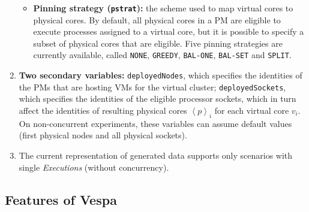 \documentclass[11pt]{article}
\newcommand{\tuple}[1]{\ensuremath{\left \langle #1 \right \rangle }}
\begin{document}
\begin{enumerate}
\begin{itemize}
  \item \textbf{Pinning strategy (\texttt{pstrat}):} the scheme used to map virtual cores to physical cores. By default, all physical cores in a PM are eligible to execute processes assigned to a virtual core, but it is possible to specify a subset of physical cores that are eligible. Five pinning strategies are currently available, called \texttt{NONE}, \texttt{GREEDY}, \texttt{BAL-ONE}, \texttt{BAL-SET} and \texttt{SPLIT}. 
  \end{itemize}

  \item \textbf{Two secondary variables:} \texttt{deployedNodes}, which specifies the identities of the PMs that are hosting VMs for the virtual cluster; \texttt{deployedSockets}, which specifies the identities of the eligible processor sockets, which in turn affect the identities of resulting physical cores $\tuple{p}_i$ for each virtual core $v_i$. On non-concurrent experiments, these variables can assume default values (first physical nodes and all physical sockets).

  \item The current representation of generated data supports only scenarios with single \emph{Executions} (without concurrency). 


\end{enumerate}

\subsection{Features of Vespa}

\end{document}
